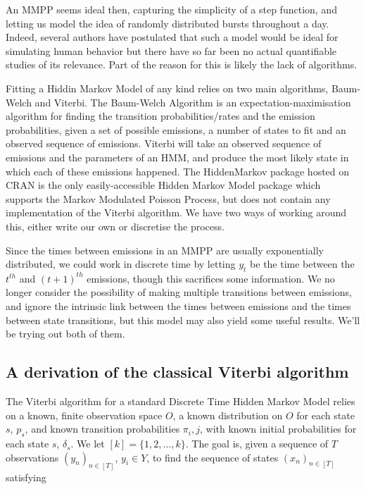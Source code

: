 An MMPP seems ideal then, capturing the simplicity of a step function, and letting us model the idea of randomly distributed bursts throughout a day. Indeed, several authors have postulated that such a model would be ideal for simulating human behavior %
but there have so far been no actual quantifiable studies of its relevance. Part of the reason for this is likely the lack of algorithms.

Fitting a Hiddin Markov Model of any kind relies on two main algorithms, Baum-Welch \cite{baumwelch}
and Viterbi\cite{viterbi}. The Baum-Welch Algorithm is an expectation-maximisation algorithm for finding the transition probabilities/rates and the emission probabilities, given a set of possible emissions, a number of states to fit and an observed sequence of emissions. Viterbi will take an observed sequence of emissions and the parameters of an HMM, and produce the most likely state in which each of these emissions happened. The HiddenMarkov package hosted on CRAN \cite{hiddenmarkov}
is the only easily-accessible Hidden Markov Model package which supports the Markov Modulated Poisson Process, but does not contain any implementation of the Viterbi algorithm. We have two ways of working around this, either write our own or discretise the process.

Since the times between emissions in an MMPP are usually exponentially distributed, we could work in discrete time by letting $y_t$ be the time between the $t^{th}$ and $(t+1)^{th}$ emissions, though this sacrifices some information. We no longer consider the possibility of making multiple transitions between emissions, and ignore the intrinsic link between the times between emissions and the times between state transitions, but this model may also yield some useful results. We'll be trying out both of them.

\subsection{A derivation of the classical Viterbi algorithm}

The Viterbi algorithm for a standard Discrete Time Hidden Markov Model relies on a known, finite observation space $O$, a known distribution on $O$ for each state $s$, $p_s$, and known transition probabilities $\pi_i,j$, with known initial probabilities for each state $s$, $\delta_s$. We let $[k] = \{1,2,...,k\}$. The goal is, given a sequence of $T$ observations $(y_n)_{n \in [T]}$, $y_i \in Y$, to find the sequence of states $(x_n)_{n \in [T]}$ satisfying


